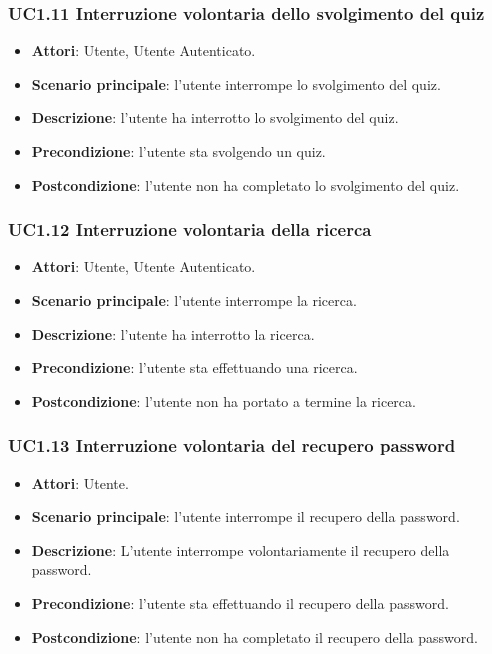\subsubsection{UC1.11 Interruzione volontaria dello svolgimento del quiz}
\begin{itemize}
\item \textbf{Attori}: Utente, Utente Autenticato.
\item \textbf{Scenario principale}: l'utente interrompe lo svolgimento del quiz.
\item \textbf{Descrizione}: l'utente ha interrotto lo svolgimento del quiz.
\item \textbf{Precondizione}: l'utente sta svolgendo un quiz.
\item \textbf{Postcondizione}: l'utente non ha completato lo svolgimento del quiz.
\end{itemize}
\subsubsection{UC1.12 Interruzione volontaria della ricerca}
\begin{itemize}
\item \textbf{Attori}: Utente, Utente Autenticato.
\item \textbf{Scenario principale}: l'utente interrompe la ricerca.
\item \textbf{Descrizione}: l'utente ha interrotto la ricerca.
\item \textbf{Precondizione}: l'utente sta effettuando una ricerca.
\item \textbf{Postcondizione}: l'utente non ha portato a termine la ricerca.
\end{itemize}
\subsubsection{UC1.13 Interruzione volontaria del recupero password}
\begin{itemize}
\item \textbf{Attori}: Utente.
\item \textbf{Scenario principale}: l'utente interrompe il recupero della password.
\item \textbf{Descrizione}: L'utente interrompe volontariamente il recupero della password.
\item \textbf{Precondizione}: l'utente sta effettuando il recupero della password.
\item \textbf{Postcondizione}: l'utente non ha completato il recupero della password.
\end{itemize}
